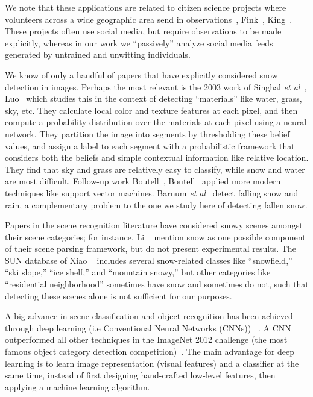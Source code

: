 We note that these applications are related to citizen science
projects where volunteers across a wide geographic area send 
in observations~\cite{greatsunflower}, Fink\etal~\cite{ebirds}, King\etal~\cite{king09snowtweets}. These projects
often use social media, but require observations to be made
explicitly, whereas in our work we ``passively'' analyze social
media feeds generated by untrained and unwitting individuals.

 We know of only a handful of
papers that have explicitly considered snow detection in
images. Perhaps the most relevant is the 2003 work of Singhal
\textit{et al}~\cite{singhal2003spatialcontext}, Luo\etal~\cite{luo2003spatialcontext}
which studies this in the context of detecting ``materials'' like
water, grass, sky, etc. They calculate local color and texture
features at each pixel, and then compute a probability
distribution over the materials at each pixel using a neural
network. They partition the image into segments by thresholding these
belief values, and assign a label to each segment with a probabilistic
framework that considers both the beliefs and simple
contextual information like relative location.
They find that sky and grass are relatively easy to classify, while snow and water are
most difficult.  Follow-up work Boutell\etal~\cite{boutell2006semanticfeature}, Boutell~\cite{boutell2005exploiting} applied more modern techniques like
support vector machines.  Barnum \textit{et al}~\cite{rain2009IJCV} detect falling snow and rain, a complementary problem to the one we study here of detecting fallen
snow.

 Papers in the scene recognition literature have considered
snowy scenes amongst their scene categories; for instance, Li \etal~\cite{li2009totalscene,li2007event} mention snow as one possible
component of their scene parsing framework, but do not present
experimental results. The SUN database of Xiao \etal~\cite{XiaoHEOT10} includes several snow-related classes like
``snowfield,'' ``ski slope,'' ``ice shelf,'' and ``mountain snowy,''
but other categories like ``residential neighborhood'' sometimes have
snow and sometimes do not, such that detecting these scenes alone
is not sufficient for our purposes. 

A big advance in scene classification and object recognition has been achieved through deep learning (i.e Conventional Neural Networks (CNNs)) ~\cite{krizhevsky2012imagenet,chatfield2011devil,zhou2014learning,grangier2009deep}. A CNN outperformed all other techniques in the ImageNet 2012 challenge (the most famous object category detection competition)~\cite{ilsvrcarxiv14}. The main advantage for deep learning is to learn image representation (visual features) and a classifier at the same time, instead of first designing hand-crafted low-level features, then applying a machine learning algorithm. 







